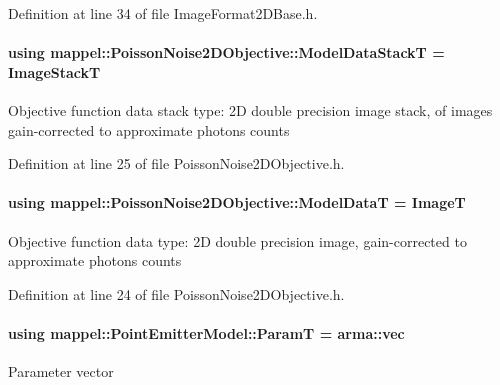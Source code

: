 Definition at line 34 of file Image\+Format2\+D\+Base.\+h.

\paragraph[{\texorpdfstring{Model\+Data\+StackT}{ModelDataStackT}}]{\setlength{\rightskip}{0pt plus 5cm}using {\bf mappel\+::\+Poisson\+Noise2\+D\+Objective\+::\+Model\+Data\+StackT} =  {\bf Image\+StackT}\hspace{0.3cm}{\ttfamily [inherited]}}\hypertarget{classmappel_1_1PoissonNoise2DObjective_a889b543eb0ba9494f749a4d1b17b59b4}{}\label{classmappel_1_1PoissonNoise2DObjective_a889b543eb0ba9494f749a4d1b17b59b4}
Objective function data stack type\+: 2D double precision image stack, of images gain-\/corrected to approximate photons counts 

Definition at line 25 of file Poisson\+Noise2\+D\+Objective.\+h.

\paragraph[{\texorpdfstring{Model\+DataT}{ModelDataT}}]{\setlength{\rightskip}{0pt plus 5cm}using {\bf mappel\+::\+Poisson\+Noise2\+D\+Objective\+::\+Model\+DataT} =  {\bf ImageT}\hspace{0.3cm}{\ttfamily [inherited]}}\hypertarget{classmappel_1_1PoissonNoise2DObjective_afe2da04c65d68529e79e41002d4f7827}{}\label{classmappel_1_1PoissonNoise2DObjective_afe2da04c65d68529e79e41002d4f7827}
Objective function data type\+: 2D double precision image, gain-\/corrected to approximate photons counts 

Definition at line 24 of file Poisson\+Noise2\+D\+Objective.\+h.

\paragraph[{\texorpdfstring{ParamT}{ParamT}}]{\setlength{\rightskip}{0pt plus 5cm}using {\bf mappel\+::\+Point\+Emitter\+Model\+::\+ParamT} =  arma\+::vec\hspace{0.3cm}{\ttfamily [inherited]}}\hypertarget{classmappel_1_1PointEmitterModel_a665ec6aea3aac139bb69a23c06d4b9a1}{}\label{classmappel_1_1PointEmitterModel_a665ec6aea3aac139bb69a23c06d4b9a1}
Parameter vector 

